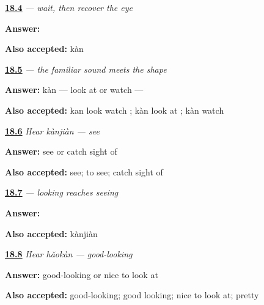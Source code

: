 \noindent\begin{minipage}[t]{\linewidth}
\raggedright
\hyperlink{review-ZH-W18-kan-delayed-write}{\textbf{18.4}} \emph{ — wait, then recover the eye}\par
\small \textbf{Answer:} \par
\footnotesize \textbf{Also accepted:}  kàn
\end{minipage}\par\medskip

\noindent\begin{minipage}[t]{\linewidth}
\raggedright
\hyperlink{review-ZH-C18-kan-read-write}{\textbf{18.5}} \emph{ — the familiar sound meets the shape}\par
\small \textbf{Answer:} kàn — look at or watch — \par
\footnotesize \textbf{Also accepted:} kan look watch ; kàn look at ; kàn watch 
\end{minipage}\par\medskip

\noindent\begin{minipage}[t]{\linewidth}
\raggedright
\hyperlink{review-ZH-C18-hear-kanjian-meaning}{\textbf{18.6}} \emph{Hear \emph{kànjiàn} — see}\par
\small \textbf{Answer:} see or catch sight of\par
\footnotesize \textbf{Also accepted:} see; to see; catch sight of
\end{minipage}\par\medskip

\noindent\begin{minipage}[t]{\linewidth}
\raggedright
\hyperlink{review-ZH-C18-kanjian-write}{\textbf{18.7}} \emph{ — looking reaches seeing}\par
\small \textbf{Answer:} \par
\footnotesize \textbf{Also accepted:}  kànjiàn
\end{minipage}\par\medskip

\noindent\begin{minipage}[t]{\linewidth}
\raggedright
\hyperlink{review-ZH-C18-hear-haokan-meaning}{\textbf{18.8}} \emph{Hear \emph{hǎokàn} — good-looking}\par
\small \textbf{Answer:} good-looking or nice to look at\par
\footnotesize \textbf{Also accepted:} good-looking; good looking; nice to look at; pretty
\end{minipage}\par\medskip

